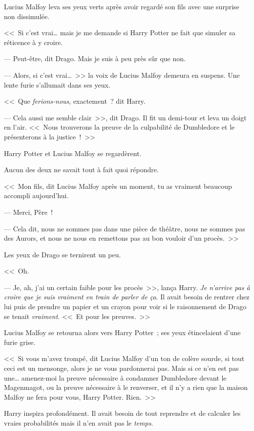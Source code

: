 Lucius Malfoy leva ses yeux verts après avoir regardé son fils avec une surprise non dissimulée.

<<~Si c'est vrai… mais je me demande si Harry Potter ne fait que simuler sa réticence à y croire.

--- Peut-être, dit Drago. Mais je suis à peu près sûr que non.

--- Alors, si c'est vrai…~>> la voix de Lucius Malfoy demeura en suspens. Une lente furie s'allumait dans ses yeux.

<<~Que \emph{ferions-nous}, exactement~? dit Harry.

--- Cela aussi me semble clair~>>, dit Drago. Il fit un demi-tour et leva un doigt en l'air. <<~Nous trouverons la preuve de la culpabilité de Dumbledore et le présenterons à la justice~!~>>

Harry Potter et Lucius Malfoy se regardèrent.

Aucun des deux ne savait tout à fait quoi répondre.

<<~Mon fils, dit Lucius Malfoy après un moment, tu as vraiment beaucoup accompli aujourd'hui.

--- Merci, Père~!

--- Cela dit, nous ne sommes pas dans une pièce de théâtre, nous ne sommes pas des Aurors, et nous ne nous en remettons pas au bon vouloir d'un procès.~>>

Les yeux de Drago se ternirent un peu.

<<~Oh.

--- Je, ah, j'ai un certain faible pour les procès~>>, lança Harry. \emph{Je n'arrive pas à croire que je suis vraiment en train de parler de ça}. Il avait besoin de rentrer chez lui puis de prendre un papier et un crayon pour voir si le raisonnement de Drago se tenait \emph{vraiment}. <<~Et pour les preuves.~>>

Lucius Malfoy se retourna alors vers Harry Potter~; ses yeux étincelaient d'une furie grise.

<<~Si vous m'avez trompé, dit Lucius Malfoy d'un ton de colère sourde, si tout ceci est un mensonge, alors je ne vous pardonnerai pas. Mais si ce n'en est pas une… amenez-moi la preuve nécessaire à condamner Dumbledore devant le Magenmagot, ou la preuve nécessaire à le renverser, et il n'y a rien que la maison Malfoy ne fera pour vous, Harry Potter. Rien.~>>

Harry inspira profondément. Il avait besoin de tout reprendre et de calculer les vraies probabilités mais il n'en avait pas le \emph{temps}.

